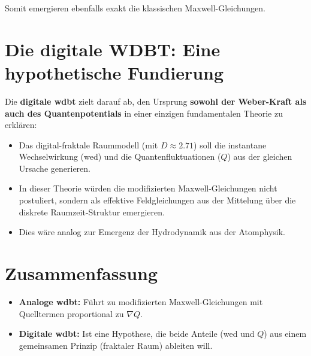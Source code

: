 Somit emergieren ebenfalls exakt die klassischen Maxwell-Gleichungen.

\section{Die digitale WDBT: Eine hypothetische Fundierung}
Die \textbf{digitale \gls{wdbt}} zielt darauf ab, den Ursprung \textbf{sowohl der Weber-Kraft als auch des Quantenpotentials} in einer einzigen fundamentalen Theorie zu erklären:

\begin{itemize}
    \item Das digital-fraktale Raummodell (mit $D \approx 2.71$) soll die instantane Wechselwirkung (\gls{wed}) und die Quantenfluktuationen ($Q$) aus der gleichen Ursache generieren.
    \item In dieser Theorie würden die modifizierten Maxwell-Gleichungen nicht postuliert, sondern als effektive Feldgleichungen aus der Mittelung über die diskrete Raumzeit-Struktur emergieren.
    \item Dies wäre analog zur Emergenz der Hydrodynamik aus der Atomphysik.
\end{itemize}

\section{Zusammenfassung}
\begin{itemize}
    \item \textbf{Analoge \gls{wdbt}:} Führt zu modifizierten Maxwell-Gleichungen mit Quelltermen proportional zu $\nabla Q$.
    \item \textbf{Digitale \gls{wdbt}:} Ist eine Hypothese, die beide Anteile (\gls{wed} und $Q$) aus einem gemeinsamen Prinzip (fraktaler Raum) ableiten will.
\end{itemize}

